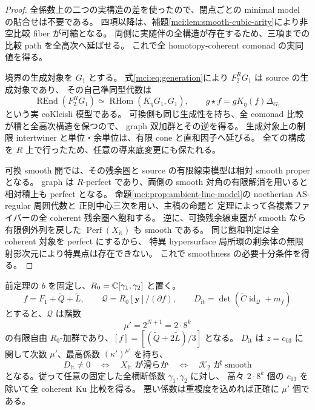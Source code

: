 \begin{proof}
全係数上の二つの実構造の差を使ったので、閉点ごとの minimal model の貼合せは不要である。
四項以降は、補題\ref{mci:lem:smooth-cubic-arity}により非空比較 fiber が可縮となる。
両側に実随伴の全構造が存在するため、三項までの比較 path を全高次へ延ばせる。
これで全 homotopy-coherent comonad の実同値を得る。

境界の生成対象を $G_1$ とする。
式\eqref{mci:eq:generation}により $F_2^RG_1$ は source の生成対象であり、
その自己準同型代数は
\[
 \operatorname{REnd}(F_2^RG_1)
       \simeq\operatorname{RHom}(K_\eta G_1,G_1),\qquad
       g\star f=gK_\eta(f)\Delta_{G_1}
\]
という実 coKleisli 模型である。
可換側も同じ生成性を持ち、全 comonad 比較が積と全高次構造を保つので、
graph 双加群とその逆を得る。
生成対象上の制限 intertwiner と単位・余単位は、有限 cone と直和因子へ延びる。
全ての構成を $R$ 上で行ったため、任意の導来底変更にも保たれる。

可換 smooth 開では、その残余圏と source の有限線束模型は相対 smooth proper となる。
graph は $R$-perfect であり、両側の smooth 対角の有限解消を用いると
相対積上も perfect となる。
命題\ref{mci:prop:ambient-line-model}の noetherian AS-regular 周囲代数と
正則中心三次を用い、主稿の命題と
定理によって各複素ファイバーの全 coherent 残余圏へ飽和する。
逆に、可換残余線束圏が smooth なら有限例外列を戻した
$\operatorname{Perf}(X_{\mathrm{it}})$ も smooth である。
同じ飽和判定は全 coherent 対象を perfect にするから、
特異 hypersurface 局所環の剰余体の無限射影次元により特異点は存在できない。
これで smoothness の必要十分条件を得る。
\end{proof}

\begin{corollary}[最後の中心三次係数に関する有限判別]
\label{mci:cor:finite-discriminant}
前定理の $b$ を固定し、$R_0=\mathbb C[\gamma_1,\gamma_2]$ と置く。
\[
 f=F_1+\widetilde Q+\widetilde L,\qquad
 \mathcal Q=R_0[\mathbf y]/(\partial f),\qquad
 D_{\mathrm{it}}=\det(\widetilde C\operatorname{id}_{\mathcal Q}+m_f)
\]
とすると、$\mathcal Q$ は階数
\[
                     \mu'=2^{N+1}=2\cdot8^k
\]
の有限自由 $R_0$-加群であり、$[f]=[(\widetilde Q+2\widetilde L)/3]$ となる。
$D_{\mathrm{it}}$ は $z=c_{03}$ に関して次数 $\mu'$、最高係数 $(\kappa')^{\mu'}$ を持ち、
\[
 D_{\mathrm{it}}\ne0\quad\Longleftrightarrow\quad
 X_{\mathrm{it}}\text{ が滑らか}
 \quad\Longleftrightarrow\quad\mathcal K_2\text{ が smooth}
\]
となる。従って任意の固定した全横断係数 $\gamma_1,\gamma_2$ に対し、
高々 $2\cdot8^k$ 個の $c_{03}$ を除いて全 coherent Ku 比較を得る。
悪い係数は重複度を込めれば正確に $\mu'$ 個である。
\end{corollary}

